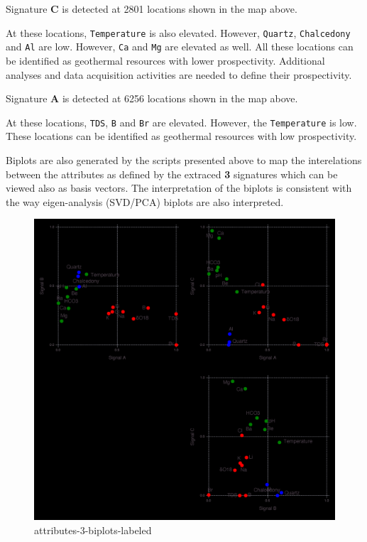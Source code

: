 \documentclass[11pt]{article}
\begin{document}
Signature \textbf{C} is detected at 2801 locations shown in the map
above.

At these locations, \texttt{Temperature} is also elevated. However,
\texttt{Quartz}, \texttt{Chalcedony} and \texttt{Al} are low. However,
\texttt{Ca} and \texttt{Mg} are elevated as well. All these locations
can be identified as geothermal resources with lower prospectivity.
Additional analyses and data acquisition activities are needed to define
their prospectivity.

Signature \textbf{A} is detected at 6256 locations shown in the map
above.

At these locations, \texttt{TDS}, \texttt{B} and \texttt{Br} are
elevated. However, the \texttt{Temperature} is low. These locations can
be identified as geothermal resources with low prospectivity.

Biplots are also generated by the scripts presented above to map the
interelations between the attributes as defined by the extraced
\textbf{3} signatures which can be viewed also as basis vectors. The
interpretation of the biplots is consistent with the way eigen-analysis
(SVD/PCA) biplots are also interpreted.

\begin{figure}
\centering
\includegraphics{../figures-postprocessing-nl-640/attributes-3-biplots-labeled.png}
\caption{attributes-3-biplots-labeled}
\end{figure}
\end{document}
